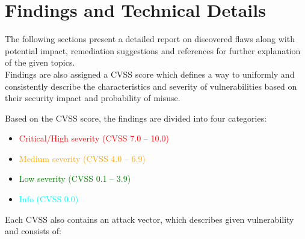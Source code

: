 \documentclass{article}
\begin{document}
\section{Findings and Technical Details}
The following sections present a detailed report on discovered flaws along with potential impact, remediation suggestions and references for further explanation of the given topics.
\\

Findings are also assigned a CVSS score which defines a way to uniformly and consistently describe the characteristics and severity of vulnerabilities based on their security impact and probability of misuse. 

Based on the CVSS score, the findings are divided into four categories:
\begin{itemize}
	\item \textcolor{red}{Critical/High severity (CVSS 7.0 – 10.0)}
	\item \textcolor{orange}{Medium severity (CVSS 4.0 – 6.9)}
	\item \textcolor{green}{Low severity (CVSS 0.1 – 3.9)}
	\item \textcolor{cyan}{Info (CVSS 0.0)}
\end{itemize}
Each CVSS also contains an attack vector, which describes given vulnerability and consists of:
\end{document}
